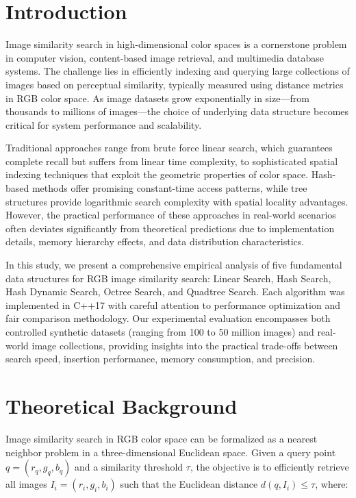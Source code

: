 \documentclass{sbc2023}
\begin{document}
\section{Introduction}
\label{sec:intro}

Image similarity search in high-dimensional color spaces is a cornerstone problem in computer vision, content-based image retrieval, and multimedia database systems. The challenge lies in efficiently indexing and querying large collections of images based on perceptual similarity, typically measured using distance metrics in RGB color space. As image datasets grow exponentially in size—from thousands to millions of images—the choice of underlying data structure becomes critical for system performance and scalability.

Traditional approaches range from brute force linear search, which guarantees complete recall but suffers from linear time complexity, to sophisticated spatial indexing techniques that exploit the geometric properties of color space. Hash-based methods offer promising constant-time access patterns, while tree structures provide logarithmic search complexity with spatial locality advantages. However, the practical performance of these approaches in real-world scenarios often deviates significantly from theoretical predictions due to implementation details, memory hierarchy effects, and data distribution characteristics.

In this study, we present a comprehensive empirical analysis of five fundamental data structures for RGB image similarity search: Linear Search, Hash Search, Hash Dynamic Search, Octree Search, and Quadtree Search. Each algorithm was implemented in C++17 with careful attention to performance optimization and fair comparison methodology. Our experimental evaluation encompasses both controlled synthetic datasets (ranging from 100 to 50 million images) and real-world image collections, providing insights into the practical trade-offs between search speed, insertion performance, memory consumption, and precision.

\section{Theoretical Background}
\label{sec:background}

Image similarity search in RGB color space can be formalized as a nearest neighbor problem in a three-dimensional Euclidean space. Given a query point $q = (r_q, g_q, b_q)$ and a similarity threshold $\tau$, the objective is to efficiently retrieve all images $I_i = (r_i, g_i, b_i)$ such that the Euclidean distance $d(q, I_i) \leq \tau$, where:
\end{document}
